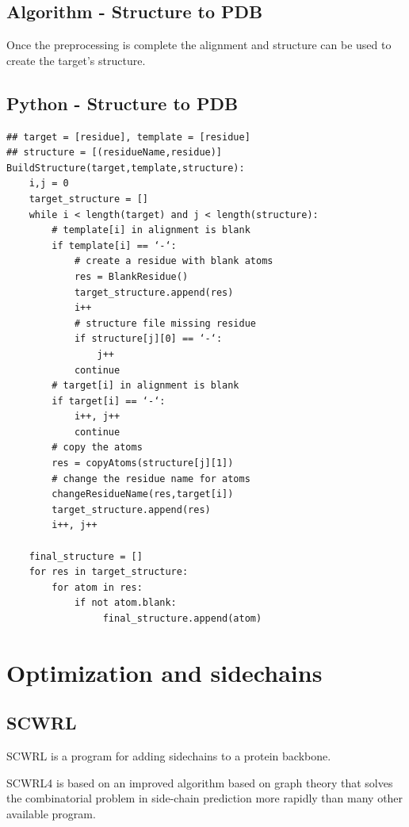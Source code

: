 \documentclass{article}
\begin{document}
\newpage
\subsection{Algorithm - Structure to PDB}

Once the preprocessing is complete the alignment and structure can be used to create the target's structure.

\subsection{Python - Structure to PDB}

\begin{lstlisting}
## target = [residue], template = [residue]
## structure = [(residueName,residue)]
BuildStructure(target,template,structure):
    i,j = 0
    target_structure = []
    while i < length(target) and j < length(structure):
        # template[i] in alignment is blank
        if template[i] == ‘-‘:
            # create a residue with blank atoms
            res = BlankResidue()
            target_structure.append(res)
            i++
            # structure file missing residue
            if structure[j][0] == ‘-‘:
                j++
            continue
        # target[i] in alignment is blank
        if target[i] == ‘-‘:
            i++, j++
            continue
        # copy the atoms
        res = copyAtoms(structure[j][1])
        # change the residue name for atoms
        changeResidueName(res,target[i])
        target_structure.append(res)
        i++, j++
    
    final_structure = []
    for res in target_structure:
        for atom in res:
            if not atom.blank:
                 final_structure.append(atom)
\end{lstlisting}


\section{Optimization and sidechains}

\subsection{SCWRL}

SCWRL is a program for adding sidechains to a protein backbone.

SCWRL4 is based on an improved algorithm based on graph theory that solves the combinatorial problem in side-chain prediction more rapidly than many other available program.\\\\
\end{document}
